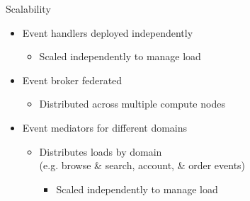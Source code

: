 \documentclass{slide}
\begin{document}
\begin{frame}{Scalability}
    \vspace{1mm}
    {\LARGE
    \begin{itemize}
        \item Event handlers deployed independently
        \begin{itemize}
            \Large\item Scaled independently to manage load
        \end{itemize}
        \vspace{3mm}
        \item<2-> Event broker federated
        \begin{itemize}
            \Large\item Distributed across multiple compute nodes
        \end{itemize}
        \vspace{3mm}
        \item<3-> Event mediators for different domains
        \begin{itemize}
            \Large\item Distributes loads by domain\\(e.g. browse \& search, account, \& order events)
            \begin{itemize}
                \large\item Scaled independently to manage load
            \end{itemize}
        \end{itemize}
    \end{itemize}
    }
\end{frame}
\end{document}
